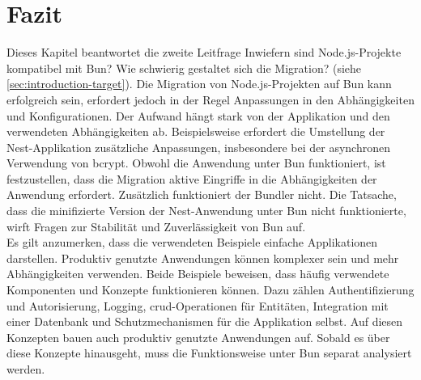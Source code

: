 \section{Fazit} \label{sec:compabitility-conclusion}
Dieses Kapitel beantwortet die zweite Leitfrage \glqq Inwiefern sind Node.js-Projekte kompatibel mit Bun? Wie schwierig gestaltet sich die Migration?\grqq{} (siehe \autoref{sec:introduction-target}). Die Migration von Node.js-Projekten auf Bun kann erfolgreich sein, erfordert jedoch in der Regel Anpassungen in den Abhängigkeiten und Konfigurationen. Der Aufwand hängt stark von der Applikation und den verwendeten Abhängigkeiten ab. Beispielsweise erfordert die Umstellung der Nest-Applikation zusätzliche Anpassungen, insbesondere bei der asynchronen Verwendung von \glq bcrypt\grq{}. Obwohl die Anwendung unter Bun funktioniert, ist festzustellen, dass die Migration aktive Eingriffe in die Abhängigkeiten der Anwendung erfordert. Zusätzlich funktioniert der Bundler nicht.  Die Tatsache, dass die minifizierte Version der Nest-Anwendung unter Bun nicht funktionierte, wirft Fragen zur Stabilität und Zuverlässigkeit von Bun auf.\\

\noindent
Es gilt anzumerken, dass die verwendeten Beispiele einfache Applikationen darstellen. Produktiv genutzte Anwendungen können komplexer sein und mehr Abhängigkeiten verwenden. Beide Beispiele beweisen, dass häufig verwendete Komponenten und Konzepte funktionieren können. Dazu zählen Authentifizierung und Autorisierung, Logging, \ac{crud}-Operationen für Entitäten, Integration mit einer Datenbank und Schutzmechanismen für die Applikation selbst. Auf diesen Konzepten bauen auch produktiv genutzte Anwendungen auf. Sobald es über diese Konzepte hinausgeht, muss die Funktionsweise unter Bun separat analysiert werden.